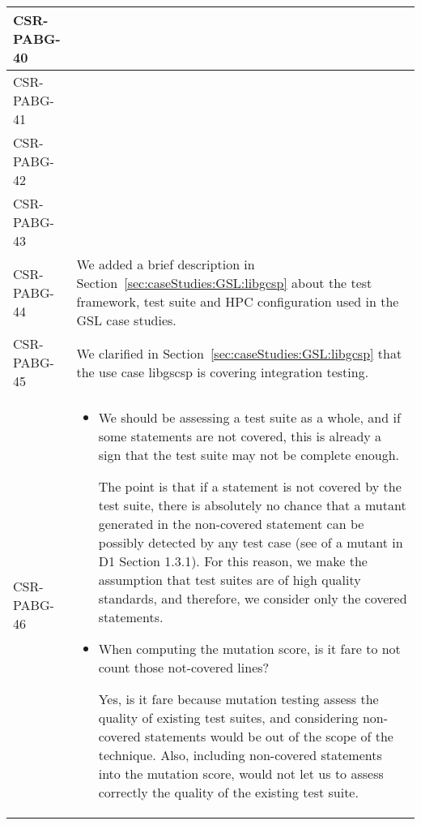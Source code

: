 \begin{longtable}{|p{1.5cm}|p{12cm}|@{}}
\hline
CSR-PABG-40&
\begin{minipage}{12cm}
\end{minipage}\\
\hline
CSR-PABG-41&
\begin{minipage}{12cm}
\end{minipage}\\
\hline
CSR-PABG-42&
\begin{minipage}{12cm}
\end{minipage}\\
\hline
CSR-PABG-43&
\begin{minipage}{12cm}
\end{minipage}\\
\hline
CSR-PABG-44&
\begin{minipage}{12cm}
We added a brief description in Section~\ref{sec:caseStudies:GSL:libgcsp} about the test framework, test suite and HPC configuration used in the GSL case studies.
\end{minipage}\\
\hline
CSR-PABG-45&
\begin{minipage}{12cm}
We clarified in Section~\ref{sec:caseStudies:GSL:libgcsp} that the use case libgscsp is covering integration testing.
\end{minipage}\\
\hline
CSR-PABG-46&
\begin{minipage}{12cm}

\begin{itemize}
	\item We should be assessing a test suite as a whole, and if some statements are not covered, this is already a sign that the test suite may not be complete enough. 
	
	The point is that if a statement is not covered by the test suite, there is absolutely no chance that a mutant generated in the non-covered statement can be possibly detected by any test case (see \INDEX{killing conditions} of a mutant in D1 Section 1.3.1). For this reason, we make the assumption that test suites are of high quality standards, and therefore, we consider only the covered statements.

	\item When computing the mutation score, is it fare to not count those not-covered lines?

	Yes, is it fare because mutation testing assess the quality of existing test suites, and considering non-covered statements would be out of the scope of the technique. Also, including non-covered statements into the mutation score, would not let us to assess correctly the quality of the existing test suite.


\end{itemize}
\end{minipage}
\end{longtable}
